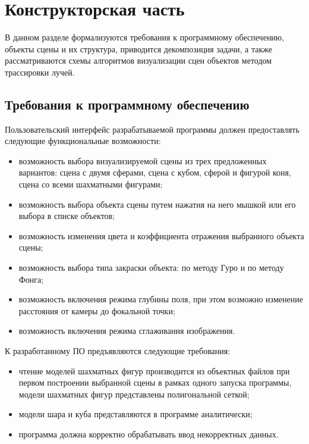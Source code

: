 \chapter{Конструкторская часть}
В данном разделе формализуются требования к программному обеспечению, объекты сцены и их структура, приводится декомпозиция задачи, а также рассматриваются схемы алгоритмов визуализации сцен объектов методом трассировки лучей.

\section{Требования к программному обеспечению}
Пользовательский интерфейс разрабатываемой программы должен предоставлять следующие функциональные возможности:
\begin{itemize}
	\item возможность выбора визуализируемой сцены из трех предложенных вариантов: сцена с двумя сферами, сцена с кубом, сферой и фигурой коня, сцена со всеми шахматными фигурами;
	\item возможность выбора объекта сцены путем нажатия на него мышкой или его выбора в списке объектов;
	\item возможность изменения цвета и коэффициента отражения выбранного объекта сцены;
	\item возможность выбора типа закраски объекта: по методу Гуро и по методу Фонга;
	\item возможность включения режима глубины поля, при этом возможно изменение расстояния от камеры до фокальной точки;
	\item возможность включения режима сглаживания изображения.
\end{itemize}

К разработанному ПО предъявляются следующие требования:
\begin{itemize}
	\item чтение моделей шахматных фигур производится из объектных файлов при первом построении выбранной сцены в рамках одного запуска программы, модели шахматных фигур представлены полигональной сеткой;
	\item модели шара и куба представляются в программе аналитически;
	\item программа должна корректно обрабатывать ввод некорректных данных.
\end{itemize}


